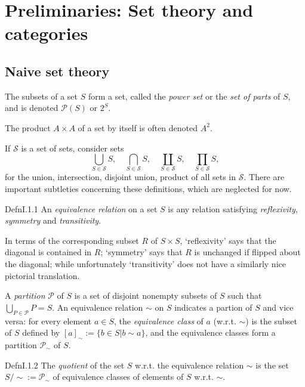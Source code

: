 \chapter{Preliminaries: Set theory and categories}

\section{Naive set theory}

The subsets of a set $S$ form a set, called the \textit{power set} or the \textit{set of parts} of $S$, and is denoted $\mathcal{P}(S)$ or $2^S$.

The product $A\times A$ of a set by itself is often denoted $A^2$.

If $\mathcal{S}$ is a set of sets, consider sets \[
  \bigcup_{S\in \mathcal{S}}S,\quad \bigcap_{S\in \mathcal{S}}S,\quad \coprod_{S\in \mathcal{S}}S,\quad \prod_{S\in \mathcal{S}}S,
\] for the union, intersection, disjoint union, product of all sets in $\mathcal{S}$. There are important subtleties concerning these definitions, which are neglected for now.


\begin{reference}{Defn}{I.1.1}
  An \textit{equivalence relation} on a set $S$ is any relation satisfying \textit{reflexivity}, \textit{symmetry} and \textit{transitivity}.
\end{reference}
In terms of the corresponding subset $R$ of $S\times S$, ‘reflexivity’ says that the diagonal is contained in $R$; ‘symmetry’ says that $R$ is unchanged if flipped about the diagonal; while unfortunately ‘transitivity’ does not have a similarly nice pictorial translation.

A \textit{partition} $\mathcal{P}$ of $S$ is a set of disjoint nonempty subsets of $S$ such that $\bigcup_{P\in \mathcal{P}}P=S$. An equivalence relation $\sim$ on $S$ indicates a partion of $S$ and vice versa: for every element $a\in S$, the \textit{equivalence class} of $a$ (w.r.t. $\sim$) is the subset of $S$ defined by $[a]_{\sim}:=\{b\in S|b\sim a\}$, and the equivalence classes form a partition $\mathcal{P}_{\sim}$ of $S$.

\begin{reference}{Defn}{I.1.2}
  The \textit{quotient} of the set $S$ w.r.t. the equivalence relation $\sim$ is the set $S/\sim:=\mathcal{P}_{\sim}$ of equivalence classes of elements of $S$ w.r.t. $\sim$.
\end{reference}

